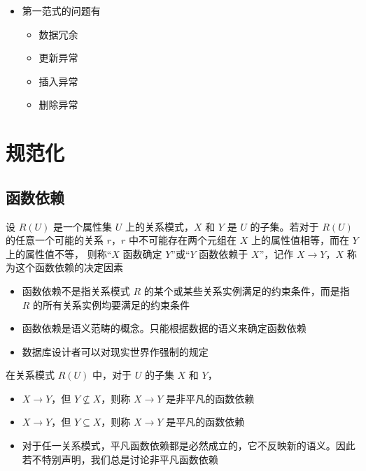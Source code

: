 \begin{itemize}
\begin{itemize}
    \end{itemize}
    \item 第一范式的问题有
    \vspace{-0.8em}
	\begin{multicols}{4}
        \begin{itemize}
            \item 数据冗余
            \item 更新异常
            \item 插入异常
            \item 删除异常
        \end{itemize}
	\end{multicols}
	\vspace{-1em}
\end{itemize}

\section{规范化}

\subsection{函数依赖}
设 $R(U)$ 是一个属性集 $U$ 上的关系模式，$X$ 和 $Y$ 是 $U$ 的子集。若对于 $R(U)$ 的任意一个可能的关系 $r$，$r$ 中不可能存在两个元组在 $X$ 上的属性值相等，而在 $Y$ 上的属性值不等， 则称“$X$ 函数确定 $Y$”或“$Y$ 函数依赖于 $X$”，记作 $X\to Y$，$X$ 称为这个函数依赖的决定因素
\begin{itemize}
    \item 函数依赖不是指关系模式 $R$ 的某个或某些关系实例满足的约束条件，而是指 $R$ 的所有关系实例均要满足的约束条件
    \item 函数依赖是语义范畴的概念。只能根据数据的语义来确定函数依赖
    \item 数据库设计者可以对现实世界作强制的规定
\end{itemize}

在关系模式 $R(U)$ 中，对于 $U$ 的子集 $X$ 和 $Y$，
\begin{itemize}
    \item $X\to Y$，但 $Y\not\subseteq X$，则称 $X \to Y$ 是非平凡的函数依赖
    \item $X\to Y$，但 $Y\subseteq X$，则称 $X \to Y$ 是平凡的函数依赖
    \item 对于任一关系模式，平凡函数依赖都是必然成立的，它不反映新的语义。因此若不特别声明，我们总是讨论非平凡函数依赖
\end{itemize}

